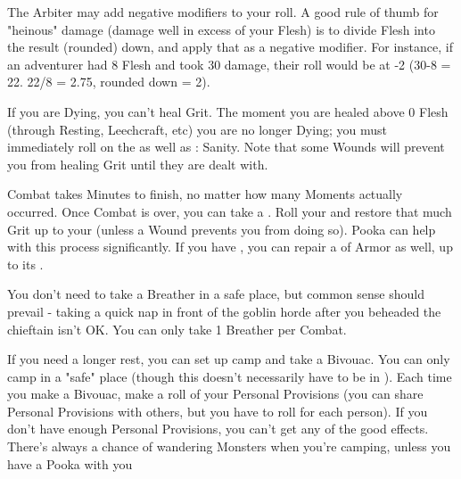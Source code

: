 {  The Arbiter may add negative modifiers to your roll.  A good rule of thumb for "heinous" damage (damage well in excess of your Flesh) is to divide \MAX Flesh into the result (rounded) down, and apply that as a negative modifier.  For instance, if an adventurer had 8 Flesh and took 30 damage, their roll would be at -2 (30-8 = 22.  22/8 = 2.75, rounded down = 2).

  If you are Dying, you can't heal Grit.  The moment you are healed above 0 Flesh (through Resting, Leechcraft, etc) you are no longer Dying; you must immediately roll on the  as well as \RS : Sanity.  Note that some Wounds will prevent you from healing Grit until they are dealt with.


  \newpage
 




  Combat takes Minutes to finish, no matter how many Moments actually occurred.  Once Combat is over, you can take a .  Roll your \FLESH and restore that much Grit up to your \MAX (unless a Wound prevents you from doing so). Pooka can help with this process significantly.  If you have , you can repair a \UD of Armor as well, up to its \MAX.

  You don't need to take a Breather in a safe place, but common sense should prevail - taking a quick nap in front of the goblin horde after you beheaded the chieftain isn't OK.  You can only take 1 Breather per Combat.



  If you need a longer rest, you can set up camp and take a Bivouac.  You can only camp in a "safe" place (though this doesn't necessarily have to be in ).  Each time you make a Bivouac, make a \UD roll of your Personal Provisions (you can share Personal Provisions with others, but you have to roll for each person).  If you don't have enough Personal Provisions, you can't get any of the good effects.  There's always a chance of wandering Monsters when you're camping, unless you have a Pooka with you




}
